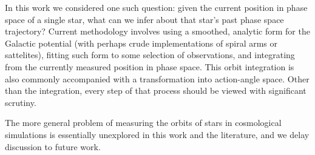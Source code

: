 \documentclass[twocolumn]{aastex62}
\newcommand{\pc}{\text{pc}}
\newcommand{\kpc}{\text{kpc}}
\newcommand{\Myr}{\text{Myr}}
\newcommand{\kms}{\text{km}/\text{s}}
\begin{document}
In this work we considered one such question: given the current position in
phase space of a single star, what can we infer about that star's past phase
space trajectory? Current methodology involves using a smoothed, analytic form
for the Galactic potential (with perhaps crude implementations of spiral arms
or sattelites), fitting such form to some selection of observations, and
integrating from the currently measured position in phase space. This orbit
integration is also commonly accompanied with a transformation into
action-angle space. Other than the integration, every step of that process
should be viewed with significant scrutiny.

The more general problem of measuring the orbits of stars in cosmological
simulations is essentially unexplored in this work and the literature, and we
delay discussion to future work.



\end{document}
